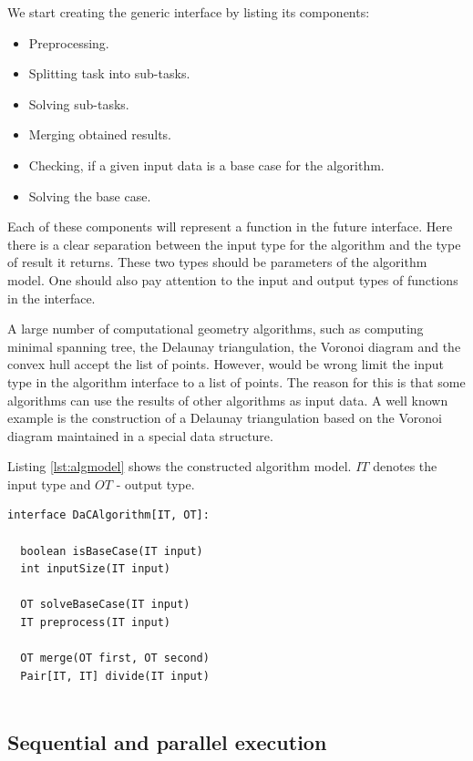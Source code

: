\documentclass[sigconf]{acmart}
\begin{document}
		We start creating the generic interface by listing its components:
		
		\begin{itemize}
			\item 
			Preprocessing.
			\item 
			Splitting task into sub-tasks.
			\item 
			Solving sub-tasks.
			\item 
			Merging obtained results.
			\item 
			Checking, if a given input data is a base case for the algorithm.
			\item 
			Solving the base case.
		\end{itemize}
		
		Each of these components will represent a function in the future interface. Here there is a clear separation between the input type for the algorithm and the type of result it returns. These two types should be parameters of the algorithm model. One should also pay attention to the input and output types of functions  in the interface.
		
		A large number of computational geometry algorithms, such as computing minimal spanning tree, the Delaunay triangulation, the Voronoi diagram and the convex hull accept the list of points. However, would be wrong limit the input type in the algorithm interface to a list of points. The reason for this is that some algorithms can use the results of other algorithms as input data. A well known example is the construction of a Delaunay triangulation based on the Voronoi diagram maintained in a special data structure.
		
		Listing \ref{lst:algmodel} shows the constructed algorithm model. $IT$ denotes the input type and $OT$ - output type.
		
		\begin{lstlisting}[caption={Algorithm model based on the ``divide-and-conquer'' principle},label={lst:algmodel},captionpos=b]
interface DaCAlgorithm[IT, OT]:

  boolean isBaseCase(IT input)
  int inputSize(IT input)
  
  OT solveBaseCase(IT input)
  IT preprocess(IT input)
  
  OT merge(OT first, OT second)
  Pair[IT, IT] divide(IT input)
  
		\end{lstlisting}
		

\subsection{Sequential and parallel execution}
\end{document}

